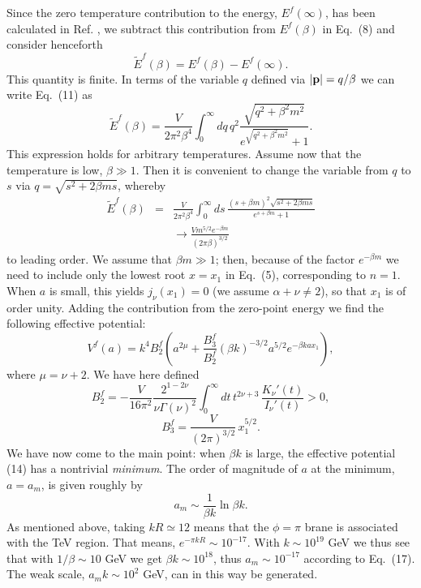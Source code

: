 \documentclass[a4paper,12pt]{article}
\begin{document}
Since the zero temperature contribution to the energy, $E^f(\infty)$, has been calculated in Ref. \cite{goldberger00a}, we subtract this contribution from $E^f(\beta)$ in Eq.~(8) and consider henceforth
\begin{equation}
\tilde{E}^f(\beta)=E^f(\beta)-E^f(\infty).
\end{equation}
\label{11}
This quantity is finite. In terms of the variable $q$ defined via $|{\bf p}|=q/\beta$ we can write Eq.~(11) as
\begin{equation}
\tilde{E}^f(\beta)=\frac{V}{2\pi^2\beta^4}\int_0^\infty dq\,
 q^2\frac{\sqrt{q^2+\beta^2m^2}}{e^{\sqrt{q^2+\beta^2m^2}}+1}.
\end{equation}
\label{12}
This expression holds for arbitrary temperatures. Assume now that the temperature is low, $\beta \gg 1$. Then it is convenient to change the variable from $q$ to $s$ via $q=\sqrt{s^2+2\beta ms}$, whereby
\begin{eqnarray}
\tilde{E}^f(\beta)&=&\frac{V}{2\pi^2\beta^4}\int_0^\infty ds\,\frac{(s+\beta m)^2\sqrt{s^2+2\beta ms}}{e^{s+\beta m}+1}
                                                   \nonumber \\
                  & &\rightarrow \frac{Vm^{5/2}e^{-\beta m}}{(2\pi \beta)^{3/2}}
\end{eqnarray}
to leading order. We assume that $\beta m \gg 1$; then, because of the factor $e^{-\beta m}$ we need to include only the lowest root $x=x_1$ in Eq.~(5), corresponding to $n=1$. When $a$ is small, this yields $j_\nu(x_1)=0$ (we assume $\alpha +\nu \neq 2$), so that $x_1$ is of order unity. Adding the contribution from the zero-point energy we find the following effective potential:
\begin{equation}
V^f(a)=k^4 B_2^f\left( a^{2\mu}+\frac{B_3^f}{B_2^f}(\beta k)^{-3/2}a^{5/2}e^{-\beta kax_1} \right),
\end{equation}
\label{14}
where $\mu=\nu+2$. We have here defined
\begin{equation}
B_2^f=-\frac{V}{16\pi^2}\frac{2^{1-2\nu}}{\nu \Gamma(\nu)^2}\int_0^\infty dt\,t^{2\nu+3}\,\frac{K_\nu '(t)}{I_\nu '(t)} >0,
\end{equation}
\label{15}
\begin{equation}
B_3^f=\frac{V}{(2\pi)^{3/2}}\,x_1^{5/2}.
\end{equation}
\label{16}
We have now come to the main point: when $\beta k$ is large, the effective potential (14) has a nontrivial {\it minimum}. The order of magnitude of $a$ at the minimum, $a=a_m$, is given roughly by
\begin{equation}
a_m \sim \frac{1}{\beta k} \ln \beta k.
\end{equation}
\label{17}
As mentioned above, taking $kR \simeq 12$ means that the $\phi=\pi$ brane is associated with the TeV region. That means, $e^{-\pi kR}\sim 10^{-17}$. With $k\sim 10^{19}$ GeV we thus see that with $1/\beta \sim 10$ GeV we get $\beta k \sim 10^{18}$, thus $a_m \sim 10^{-17}$ according to Eq.~(17). The weak scale, $a_m k \sim 10^2$ GeV, can in this way be generated.
\end{document}
